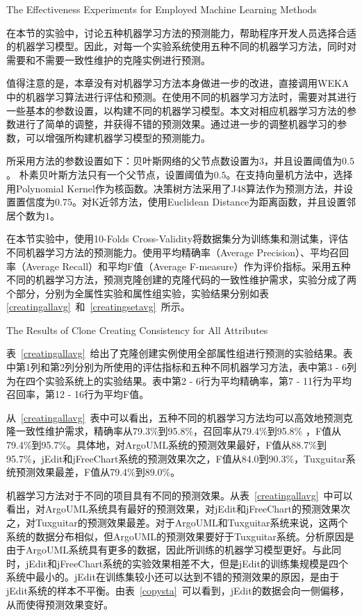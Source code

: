 {The Effectiveness Experiments for Employed Machine Learning Methods}

在本节的实验中，讨论五种机器学习方法的预测能力，帮助程序开发人员选择合适的机器学习模型。因此，对每一个实验系统使用五种不同的机器学习方法，同时对需要和不需要一致性维护的克隆实例进行预测。

值得注意的是，本章没有对机器学习方法本身做进一步的改进，直接调用WEKA中的机器学习算法进行评估和预测。在使用不同的机器学习方法时，需要对其进行一些基本的参数设置，以构建不同的机器学习模型。本文对相应机器学习方法的参数进行了简单的调整，并获得不错的预测效果。通过进一步的调整机器学习的参数，可以增强所构建机器学习模型的预测能力。

所采用方法的参数设置如下：贝叶斯网络的父节点数设置为$3$，并且设置阈值为$0.5$。 朴素贝叶斯方法只有一个父节点，设置阈值为$0.5$。在支持向量机方法中，选择用Polynomial Kernel作为核函数。决策树方法采用了J48算法作为预测方法，并设置置信度为$0.75$。对K近邻方法，使用Euclidean Distance为距离函数，并且设置邻居个数为$1$。

在本节实验中，使用10-Folds Cross-Validity将数据集分为训练集和测试集，评估不同机器学习方法的预测能力。使用平均精确率（Average Precision）、平均召回率（Average Recall）和平均F值（Average F-measure）作为评价指标。采用五种不同的机器学习方法，预测克隆创建的克隆代码的一致性维护需求，实验分成了两个部分，分别为全属性实验和属性组实验，实验结果分别如表\ref{creatingallavg}~和~\ref{creatingsetavg}~所示。

{The Results of Clone Creating Consistency for All Attributes}

表~\ref{creatingallavg}~给出了克隆创建实例使用全部属性组进行预测的实验结果。表中第1列和第2列分别为所使用的评估指标和五种不同机器学习方法，表中第3 - 6列为在四个实验系统上的实验结果。表中第2 - 6行为平均精确率，第7 - 11行为平均召回率，第12 - 16行为平均F值。

从~\ref{creatingallavg}~表中可以看出，五种不同的机器学习方法均可以高效地预测克隆一致性维护需求，精确率从79.3\%到95.8\%，召回率从79.4\%到95.8\% ，F值从79.4\%到95.7\%。具体地，对ArgoUML系统的预测效果最好，F值从88.7\%到95.7\%，jEdit和jFreeChart系统的预测效果次之，F值从84.0到90.3\%，Tuxguitar系统预测效果最差，F值从79.4\%到89.0\%。

机器学习方法对于不同的项目具有不同的预测效果。从表~\ref{creatingallavg}~中可以看出，对ArgoUML系统具有最好的预测效果，对jEdit和jFreeChart的预测效果次之，对Tuxguitar的预测效果最差。对于ArgoUML和Tuxguitar系统来说，这两个系统的数据分布相似，但ArgoUML的预测效果要好于Tuxguitar系统。分析原因是由于ArgoUML系统具有更多的数据，因此所训练的机器学习模型更好。与此同时，jEdit和jFreeChart系统的实验效果相差不大，但是jEdit的训练集规模是四个系统中最小的。jEdit在训练集较小还可以达到不错的预测效果的原因，是由于jEdit系统的样本不平衡。由表~\ref{copysta}~可以看到，jEdit的数据会向一侧偏移，从而使得预测效果变好。

